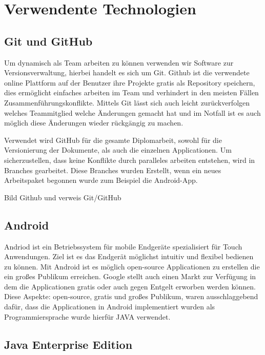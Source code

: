 \chapter{Verwendente Technologien}
\section{Git und GitHub}
Um dynamisch als Team arbeiten zu können verwenden wir Software zur Versionsverwaltung, hierbei handelt es sich um Git. 
Github ist die verwendete online Plattform auf der Benutzer ihre Projekte gratis als Repository speichern, dies ermöglicht einfaches arbeiten im Team und verhindert in den meisten Fällen Zusammenführungskonflikte. Mittels Git lässt sich auch leicht zurückverfolgen welches Teammitglied welche Änderungen gemacht hat und im Notfall ist es auch möglich diese Änderungen wieder rückgängig zu machen.

Verwendet wird GitHub für die gesamte Diplomarbeit, sowohl für die Versionierung der Dokumente, als auch  die einzelnen Applicationen. Um sicherzustellen, dass keine Konflikte durch paralleles arbeiten entstehen, wird in Branches gearbeitet. Diese Branches wurden Erstellt, wenn ein neues Arbeitspaket begonnen wurde zum Beispiel die Android-App.

Bild Github und verweis Git/GitHub

\section{Android}

Andriod ist ein Betriebssystem für mobile Endgeräte spezialisiert für Touch Anwendungen. Ziel ist es das Endgerät möglichst intuitiv und flexibel bedienen zu können. Mit Android ist es möglich open-source Applicationen zu erstellen die ein großes Publikum erreichen. Google stellt auch einen Markt zur Verfügung in dem die Applicationen gratis oder auch gegen Entgelt erworben werden können.
Diese Aspekte: open-source, gratis und großes Publikum, waren ausschlaggebend dafür, dass die Applicationen in Android implementiert wurden als Programmiersprache wurde hierfür JAVA verwendet.


\section{Java Enterprise Edition} 